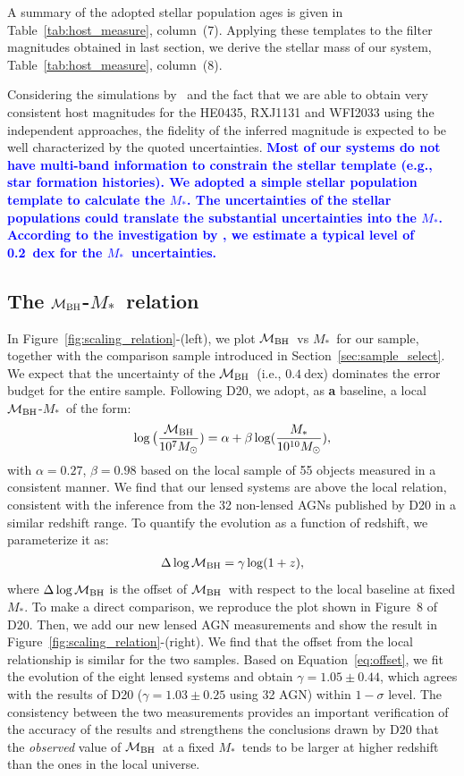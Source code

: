 \documentclass[fleqn,usenatbib]{mnras}
\newcommand{\mbh}{$\mathcal M_{\rm BH}$}
\newcommand{\mstar}{{$M_*$}}
\newcommand{\blue}[1]{{\bf \textcolor{blue}{#1}}}
\begin{document}
A summary of the adopted stellar population ages is given in Table~\ref{tab:host_measure}, column~(7). Applying these templates to the filter magnitudes obtained in last section, we derive the stellar mass of our system, Table~\ref{tab:host_measure}, column~(8).

Considering the simulations by~\citet{Ding2017a} and the fact that we are able to obtain very consistent host magnitudes for the HE0435, RXJ1131 and WFI2033 using the independent approaches, the fidelity of the inferred magnitude is expected to be well characterized by the quoted uncertainties.
\blue{
Most of our systems do not have multi-band information to constrain the stellar template (e.g., star formation histories). We adopted a simple stellar population template to calculate the \mstar.
The uncertainties of the stellar populations could translate the substantial uncertainties into the \mstar. According to the investigation by \citet{Bell2001}, we estimate a typical level of 0.2~dex for the \mstar\ uncertainties.}

\subsection{The \mbh-\mstar\ relation}\label{sec:relation}
In Figure~\ref{fig:scaling_relation}-(left), we plot \mbh\ vs \mstar\ for our sample, together with the comparison sample introduced in Section~\ref{sec:sample_select}.  We expect that the uncertainty of the \mbh\ (i.e., $0.4~$dex) dominates the error budget for the entire sample. Following D20, we adopt, as {\bf a} baseline, a local \mbh-\mstar\ of the form:
\begin{eqnarray}
\label{eq:MMlocal}
\log \big( \frac{\mathcal M_{\rm BH}}{10^{7}M_{\odot}})= \alpha + \beta \log(\frac{M_*}{10^{10}M_{\odot}}),
  \end {eqnarray}
with  $\alpha = 0.27$, $\beta = 0.98$ based on the local sample of 55 objects measured in a consistent manner. We find that our lensed systems are above the local relation, consistent with the inference from the 32  non-lensed AGNs published by D20 in a  similar redshift range. To quantify the evolution as a function of redshift, we parameterize it as:
\begin{eqnarray}
\label{eq:offset}
\Delta \log \mathcal M_{\rm BH}= \gamma \log (1 + z),
\end{eqnarray} 
where $\Delta \log \mathcal M_{\rm BH}$ is the offset of \mbh\ with respect to the local baseline at fixed \mstar. To make a direct comparison, we reproduce the plot shown in Figure~8 of D20. Then, we add our new lensed AGN measurements and show the result in Figure~\ref{fig:scaling_relation}-(right). We find that the offset from the local relationship is similar for the two samples. Based on Equation~\eqref{eq:offset}, we fit the evolution of the eight lensed systems and obtain $\gamma=1.05\pm0.44$, which agrees with the results of D20 ($\gamma=1.03\pm0.25$ using 32 AGN) within $1-\sigma$ level. The consistency between the two measurements provides an important verification of the accuracy of the results and strengthens the conclusions drawn by D20 that the {\it observed} value of \mbh\ at a fixed \mstar\ tends to be larger at higher redshift than the ones in the local universe.
\end{document}
